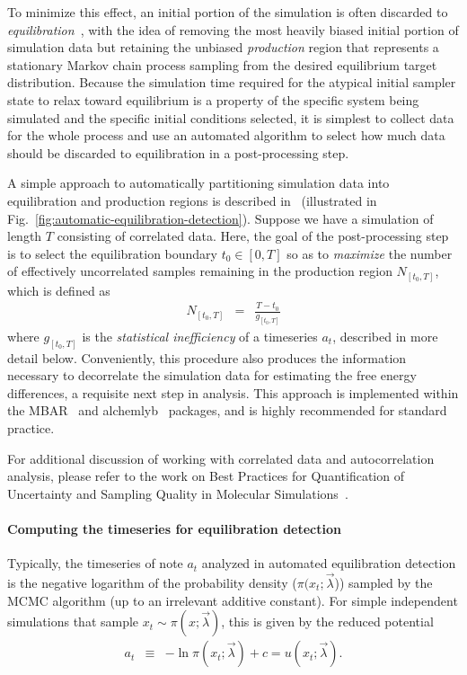 \documentclass[9pt,bestpractices,pubversion]{livecoms}
\begin{document}
To minimize this effect, an initial portion of the simulation is often discarded to \emph{equilibration}~\cite{braun2019best}, with the idea of removing the most heavily biased initial portion of simulation data but retaining the unbiased \emph{production} region that represents a stationary Markov chain process sampling from the desired equilibrium target distribution.
Because the simulation time required for the atypical initial sampler state to relax toward equilibrium is a property of the specific system being simulated and the specific initial conditions selected, it is simplest to collect data for the whole process and use an automated algorithm to select how much data should be discarded to equilibration in a post-processing step.

A simple approach to automatically partitioning simulation data into equilibration and production regions is described in~\cite{chodera2016simple} (illustrated in Fig.~\ref{fig:automatic-equilibration-detection}).
Suppose we have a simulation of length $T$ consisting of correlated data.
Here, the goal of the post-processing step is to select the equilibration boundary $t_0 \in [0, T]$ so as to \emph{maximize} the number of effectively uncorrelated samples remaining in the production region $N_{[t_0,T]}$, which is defined as
\begin{eqnarray}
N_{[t_0,T]} &=& \frac{T - t_0}{g_{[t_0,T]}}
\end{eqnarray}
where $g_{[t_0,T]}$ is the \emph{statistical inefficiency} of a timeseries $a_t$, described in more detail below.
Conveniently, this procedure also produces the information necessary to decorrelate the simulation data for estimating the free energy differences, a requisite next step in analysis.
This approach is implemented within the MBAR~\cite{kylebeauchamp2019choderalab} and alchemlyb~\cite{daviddotson2019alchemistry} packages, and is highly recommended for standard practice.

For additional discussion of working with correlated data and autocorrelation analysis, please refer to the work on Best Practices for Quantification of Uncertainty and Sampling Quality in Molecular Simulations~\cite{grossfield2018best}.

\paragraph{Computing the timeseries for equilibration detection}
Typically, the timeseries of note $a_t$ analyzed in automated equilibration detection is the negative logarithm of the probability density ($\pi(x_t; \vec{\lambda}$)) sampled by the MCMC algorithm (up to an irrelevant additive constant).
For simple independent simulations that sample $x_t \sim \pi(x ; \vec{\lambda})$, this is given by the reduced potential
\begin{eqnarray}
a_t &\equiv& - \ln \pi(x_t; \vec{\lambda}) + c = u(x_t; \vec{\lambda}) .
\end{eqnarray}
\end{document}
